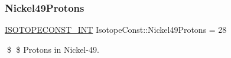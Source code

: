 \subsubsection{\texorpdfstring{Nickel49\+Protons}{Nickel49Protons}}
{\footnotesize\ttfamily \mbox{\hyperlink{group___isotope_const-_macros_ga5f18360b3e99483a35c32d789e62621c}{I\+S\+O\+T\+O\+P\+E\+C\+O\+N\+S\+T\+\_\+\+I\+NT}} Isotope\+Const\+::\+Nickel49\+Protons = 28}

\$ \$ Protons in Nickel-\/49. 